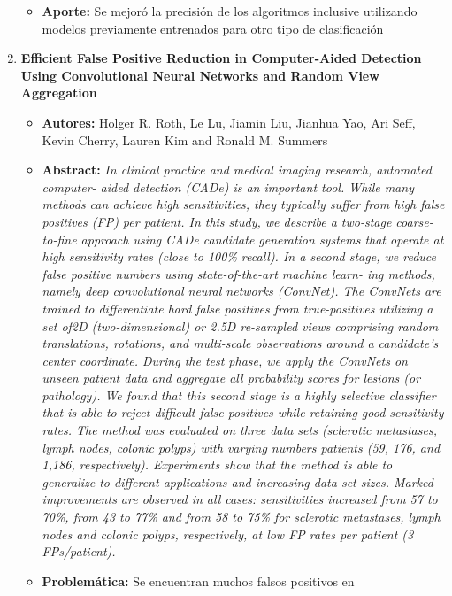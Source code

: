 \begin{enumerate}[label=\textbf{\arabic*}]
\begin{itemize}
        \item{\textbf{Aporte:}} Se mejoró la precisión de los algoritmos
        inclusive utilizando modelos previamente entrenados para otro tipo de clasificación
    \end{itemize}
    \item \textbf{Efficient False Positive Reduction in Computer-Aided Detection Using Convolutional Neural Networks and Random View Aggregation}~\cite{Lu}
    \begin{itemize} 
        \item{\textbf{Autores:}} Holger R. Roth, Le Lu, Jiamin Liu, Jianhua Yao,
        Ari Seff, Kevin Cherry, Lauren Kim and Ronald M. Summers
        \item{\textbf{Abstract:}} \textit{In clinical practice and medical
        imaging research, automated computer- aided detection (CADe) is an
        important tool. While many methods can achieve high sensitivities, they
        typically suffer from high false positives (FP) per patient. In this
        study, we describe a two-stage coarse-to-fine approach using CADe
        candidate generation systems that operate at high sensitivity rates
        (close to 100\% recall). In a second stage, we reduce false positive
        numbers using state-of-the-art machine learn- ing methods, namely deep
        convolutional neural networks (ConvNet). The ConvNets are trained to
        differentiate hard false positives from true-positives utilizing a set
        of2D (two-dimensional) or 2.5D re-sampled views comprising random
        translations, rotations, and multi-scale observations around a
        candidate’s center coordinate. During the test phase, we apply the
        ConvNets on unseen patient data and aggregate all probability scores
        for lesions (or pathology). We found that this second stage is a highly
        selective classifier that is able to reject difficult false positives
        while retaining good sensitivity rates. The method was evaluated on
        three data sets (sclerotic metastases, lymph nodes, colonic polyps) with
        varying numbers patients (59, 176, and 1,186, respectively). Experiments
        show that the method is able to generalize to different applications and
        increasing data set sizes. Marked improvements are observed in all
        cases: sensitivities increased from 57 to 70\%, from 43 to 77\% and from
        58 to 75\% for sclerotic metastases, lymph nodes and colonic polyps,
        respectively, at low FP rates per patient (3 FPs/patient).}
        \item{\textbf{Problemática:}} Se encuentran muchos falsos positivos en

\end{itemize}
\end{enumerate}
